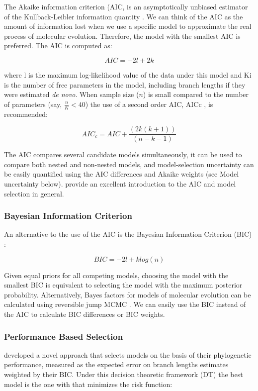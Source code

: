 The Akaike information criterion (AIC, \citep{Akaike-1974} is an asymptotically unbiased estimator of the Kullback-Leibler information quantity \citep{Kullback-1951}. We can think of the AIC as the amount of information lost when we use a specific model to approximate the real process of molecular evolution. Therefore, the model with the smallest AIC is preferred. The AIC is computed as:

\[
AIC=-2l+2k
\]

where l is the maximum log-likelihood value of the data under this model and Ki is the number of free parameters in the model, including branch lengths if they were estimated \emph{de novo}. When sample size ($n$) is small compared to the number of parameters (say, $\frac{n}{K} < 40$) the use of a second order AIC, AICc \citep{Sugiura-1978, Hurvich-1989}, is recommended:

\[
AIC_c=AIC+\frac{(2k(k+1))}{(n-k-1)}
\]

The AIC compares several candidate models simultaneously, it can be used to compare both nested and non-nested models, and model-selection uncertainty can be easily quantified using the AIC differences and Akaike weights (see Model uncertainty below). \citet{Burnham-2003} provide an excellent introduction to the AIC and model selection in general.

\subsubsection{Bayesian Information Criterion}
\label{sec:bic}

An alternative to the use of the AIC is the Bayesian Information Criterion (BIC) \citep{Schwarz-1978}:

\[
BIC=-2l + k log(n)
\]

Given equal priors for all competing models, choosing the model with the smallest BIC is equivalent to selecting the model with the maximum posterior probability. Alternatively, Bayes factors for models of molecular evolution can be calculated using reversible jump MCMC \citep{Huelsenbeck-2004}. We can easily use the BIC instead of the AIC to calculate BIC differences or BIC weights.

\subsubsection{Performance Based Selection}
\label{sec:dt}

\citet{Minin-2003} developed a novel approach that selects models on the basis of their phylogenetic performance, measured as the expected error on branch lengths estimates weighted by their BIC. Under this decision theoretic framework (DT) the best model is the one with that minimizes the risk function:

